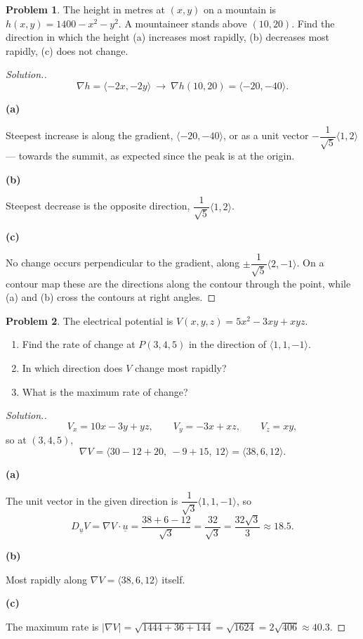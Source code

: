 \documentclass[11pt,a4paper]{article}
\theoremstyle{definition}
\newtheorem{problemx}{Problem}[subsection]
\newenvironment{problem}{\begin{problemx}}{\end{problemx}}
\newenvironment{solution}
  {\renewcommand{\qedsymbol}{}\begin{proof}[\textit{Solution}.]}
  {\end{proof}}
\newcommand{\subhead}[1]{%
  \par\medskip\noindent\textbf{#1}\par\nobreak\smallskip}
\begin{document}
\begin{problem}
The height in metres at $(x,y)$ on a mountain is $h(x,y) = 1400-x^2-y^2$. A
mountaineer stands above $(10,20)$. Find the direction in which the height
(a) increases most rapidly, (b) decreases most rapidly, (c) does not change.
\end{problem}
\begin{solution}
$$\nabla h = \langle -2x, -2y\rangle
\ \longrightarrow\ \nabla h(10,20) = \langle -20, -40\rangle .$$

\subhead{(a)} Steepest increase is along the gradient,
$\langle -20,-40\rangle$, or as a unit vector
$-\dfrac{1}{\sqrt5}\langle 1,2\rangle$ --- towards the summit, as expected since
the peak is at the origin.

\subhead{(b)} Steepest decrease is the opposite direction,
$\dfrac{1}{\sqrt5}\langle 1,2\rangle$.

\subhead{(c)} No change occurs perpendicular to the gradient, along
$\pm\dfrac{1}{\sqrt5}\langle 2,-1\rangle$. On a contour map these are the
directions along the contour through the point, while (a) and (b) cross the
contours at right angles.
\end{solution}

\begin{problem}
The electrical potential is $V(x,y,z) = 5x^2-3xy+xyz$.
\begin{enumerate}
\item[(a)] Find the rate of change at $P(3,4,5)$ in the direction of
$\langle 1,1,-1\rangle$.
\item[(b)] In which direction does $V$ change most rapidly?
\item[(c)] What is the maximum rate of change?
\end{enumerate}
\end{problem}
\begin{solution}
$$V_x = 10x-3y+yz,\qquad V_y = -3x+xz,\qquad V_z = xy ,$$
so at $(3,4,5)$,
$$\nabla V = \langle 30-12+20,\ -9+15,\ 12\rangle = \langle 38, 6, 12\rangle .$$

\subhead{(a)}
The unit vector in the given direction is
$\dfrac{1}{\sqrt3}\langle 1,1,-1\rangle$, so
$$D_{\underline{u}}V = \nabla V\cdot\underline{u}
= \frac{38+6-12}{\sqrt3} = \frac{32}{\sqrt3} = \frac{32\sqrt3}{3}\approx 18.5 .$$

\subhead{(b)}
Most rapidly along $\nabla V = \langle 38,6,12\rangle$ itself.

\subhead{(c)}
The maximum rate is
$\left|\nabla V\right| = \sqrt{1444+36+144} = \sqrt{1624} = 2\sqrt{406}
\approx 40.3$.
\end{solution}
\end{document}
